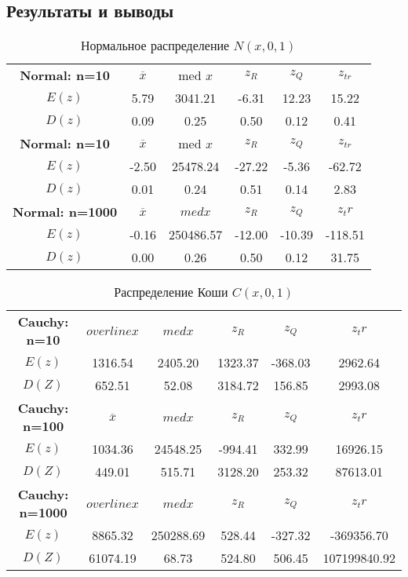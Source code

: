 \documentclass[14pt]{extarticle}
\begin{document}
\subsection{Результаты и выводы}

\begin{table}[htbp]
    \centering
    \begin{tabular}{|c|c|c|c|c|c|}
        \toprule
        \textbf{Normal: n=10} & \(\overline{x}\) & med \(x\) & \(z_R\) & \(z_Q\) & \(z_{tr}\)\\
        \(E(z)\) & 5.79 & 3041.21 & -6.31 & 12.23 & 15.22 \\
        \(D(z)\) & 0.09 & 0.25 & 0.50 & 0.12 & 0.41 \\
        \midrule
  	\textbf{Normal: n=10} & \(\overline{x}\) & med \(x\) & \(z_R\) & \(z_Q\) & \(z_{tr}\)\\
        \(E(z)\) & -2.50 & 25478.24 & -27.22 & -5.36 & -62.72  \\
        \(D(z)\) & 0.01 & 0.24 & 0.51 & 0.14 & 2.83 \\
        \midrule
	\textbf{Normal: n=1000} & \(\overline{x}\) & \(med x\) & \(z_R\) & \(z_Q\) & \(z_tr\)\\
        \(E(z)\) & -0.16 & 250486.57 & -12.00 & -10.39 & -118.51  \\
        \(D(z)\) & 0.00 & 0.26 & 0.50 & 0.12 & 31.75 \\
        \toprule
    \end{tabular}
    \caption{Нормальное распределение \(N(x, 0, 1)\)}
    \label{tab:normal_t}
\end{table}

\begin{table}[htbp]
    \centering
    \begin{tabular}{|c|c|c|c|c|c|}
        \toprule
        \textbf{Cauchy: n=10} & \(overline{x}\) & \(med x\) & \(z_R\) & \(z_Q\) & \(z_tr\)\\
        \(E(z)\) & 1316.54 & 2405.20 & 1323.37 & -368.03 & 2962.64 \\
        \(D(Z)\) & 652.51 & 52.08 & 3184.72 & 156.85 & 2993.08 \\
        \midrule
  	\textbf{Cauchy: n=100} & \(\overline{x}\) & \(med x\) & \(z_R\) & \(z_Q\) & \(z_tr\)\\
        \(E(z)\) & 1034.36 & 24548.25 & -994.41 & 332.99 & 16926.15   \\
        \(D(Z)\) & 449.01 & 515.71 & 3128.20 & 253.32 & 87613.01 \\
        \midrule
	\textbf{Cauchy: n=1000} & \(overline{x}\) & \(med x\) & \(z_R\) & \(z_Q\) & \(z_tr\)\\
        \(E(z)\) & 8865.32 & 250288.69 & 528.44 & -327.32 & -369356.70   \\
        \(D(Z)\) & 61074.19 & 68.73 & 524.80 & 506.45 & 107199840.92  \\
        \toprule
    \end{tabular}
    \caption{Распределение Коши \(C(x, 0, 1)\)}
    \label{tab:cauchy_t}
\end{table}
\end{document}
